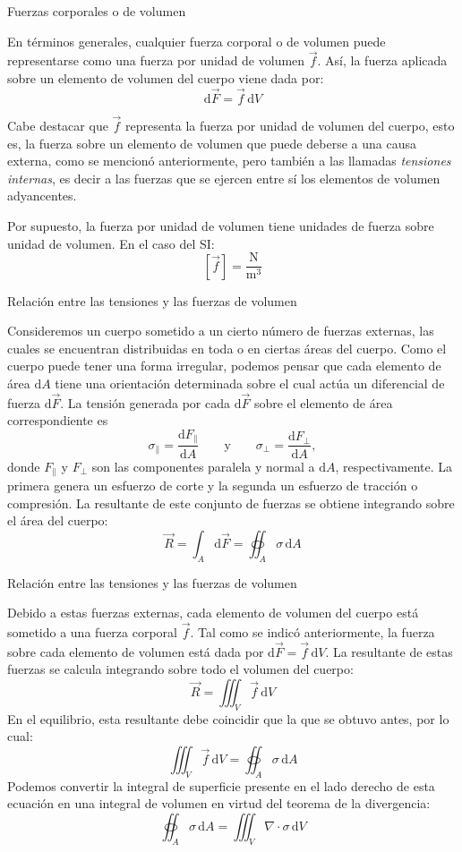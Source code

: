 \documentclass[11pt,handout,aspectratio=1610]{beamer}
\newcommand{\diff}[0]{\text{d}}
\newcommand{\fdiff}[2]{\dfrac{\text{d} #1}{\text{d} #2}}
\newcommand{\vs}{\vspace{11pt}}
\newcommand{\un}[1]{\text{#1}}
\begin{document}
\begin{frame}{Fuerzas corporales o de volumen}
    
    En términos generales, cualquier fuerza corporal o de volumen puede representarse como una fuerza por unidad de volumen $\vec{f}$. Así, la fuerza aplicada sobre un elemento de volumen del cuerpo viene dada por: $$\diff \vec{F} = \vec{f} \, \diff V $$

    Cabe destacar que $\vec{f}$ representa la fuerza por unidad de volumen del cuerpo, esto es, la fuerza sobre un elemento de volumen que puede deberse a una causa externa, como se mencionó anteriormente, pero también a las llamadas \emph{tensiones internas}, es decir a las fuerzas que se ejercen entre sí los elementos de volumen adyancentes.

    \vs

    Por supuesto, la fuerza por unidad de volumen tiene unidades de fuerza sobre unidad de volumen. En el caso del SI: $$ \left[\vec{f}\right] = \frac{\un{N}}{\un{m}^3} $$

\end{frame}

\begin{frame}{Relación entre las tensiones y las fuerzas de volumen}

    Consideremos un cuerpo sometido a un cierto número de fuerzas externas, las cuales se encuentran distribuidas en toda o en ciertas áreas del cuerpo. Como el cuerpo puede tener una forma irregular, podemos pensar que cada elemento de área $\diff A$ tiene una orientación determinada sobre el cual actúa un diferencial de fuerza $\diff \vec{F}$. La tensión generada por cada $\diff \vec{F}$ sobre el elemento de área correspondiente es $$ \sigma_\parallel = \fdiff{F_\parallel}{A} \qquad \text{y} \qquad \sigma_\perp = \fdiff{F_\perp}{A}, $$ donde $F_\parallel$ y $F_\perp$ son las componentes paralela y normal a $\diff A$, respectivamente. La primera genera un esfuerzo de corte y la segunda un esfuerzo de tracción o compresión. La resultante de este conjunto de fuerzas se obtiene integrando sobre el área del cuerpo: $$ \vec{R} = \int_A \diff \vec{F} = \oiint_A \sigma \, \diff A $$

\end{frame}

\begin{frame}{Relación entre las tensiones y las fuerzas de volumen}

    Debido a estas fuerzas externas, cada elemento de volumen del cuerpo está sometido a una fuerza corporal $\vec{f}$. Tal como se indicó anteriormente, la fuerza sobre cada elemento de volumen está dada por $\diff \vec{F} = \vec{f} \, \diff V$. La resultante de estas fuerzas se calcula integrando sobre todo el volumen del cuerpo: $$\vec{R} = \iiint_V \vec{f} \, \diff V $$ En el equilibrio, esta resultante debe coincidir que la que se obtuvo antes, por lo cual: $$ \iiint_V \vec{f} \, \diff V = \oiint_A \sigma \, \diff A $$ Podemos convertir la integral de superficie presente en el lado derecho de esta ecuación en una integral de volumen en virtud del teorema de la divergencia: $$ \oiint_A \sigma \, \diff A = \iiint_V \nabla \cdot \sigma \, \diff V $$ 
 
    
\end{frame}
\end{document}
